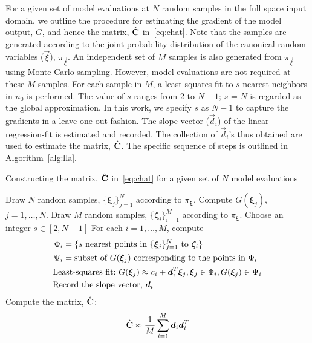 For a given set of model evaluations at $N$ random samples in the full space input domain,
we outline the procedure for estimating the gradient of the model output, $G$, and hence the
matrix, $\hat{\mathbf{{C}}}$ in~\eqref{eq:chat}.
Note that the samples are generated
according to the joint probability distribution of the canonical random variables
($\vec\xi$), $\pi_\vec\xi$. An independent set of $M$ samples is also generated from $\pi_\vec\xi$
using Monte Carlo sampling. However, model evaluations are not required at these $M$ samples.
For each sample in $M$, a least-squares fit to $s$ nearest neighbors in
$n_0$ is performed. The value of $s$ ranges from 2 to $N-1$; $s$ = $N$ is regarded as the global approximation.
In this work, we specify $s$ as $N-1$ to capture the gradients in a leave-one-out fashion.
The slope vector ($\vec{d}_i$) of the linear regression-fit is estimated and recorded.
The collection of $\vec{d}_i$'s thus obtained are used to estimate the matrix, $\hat{\mathbf{{C}}}$. The specific 
sequence of steps is outlined in Algorithm~\ref{alg:lla}.
%
\bigskip
\begin{breakablealgorithm}
\renewcommand{\algorithmicrequire}{\textbf{Input:}}
\renewcommand{\algorithmicensure}{\textbf{Output:}}
  \caption{Constructing the matrix, $\hat{\mathbf{{C}}}$ in~\eqref{eq:chat} for a given set of $N$ model evaluations}
  \begin{algorithmic}[1]
	\State Draw $N$ random samples, $\{\bm{\xi}_j\}_{j=1}^{N}$ 
	according to $\pi_{\bm{\xi}}$.
	\State Compute $G(\bm\xi_j)$, $j=1, \ldots, N$.
	\State Draw $M$ random samples, $\{\bm{\zeta}_i\}_{i=1}^{M}$
	according to $\pi_{\bm{\xi}}$.
	\State Choose an integer $s \in [2,N-1]$ 
	\State For each $i=1, \ldots, M$, compute 
	\[
	\begin{aligned}
	\Phi_i &= \{ s \text{ nearest points in } \{\bm{\xi}_j\}_{j=1}^{N} \text{ to } \bm{\zeta}_i\}\\
	\vspace{-2mm}
	\Psi_i &= \text{subset of } G(\bm\xi_j) \text{ corresponding to the points in } \Phi_i\\
	\vspace{-2mm}
	 &{\color{white}=} \hspace{-7mm} \text{Least-squares fit:~} 
	 G(\bm\xi_j) \approx c_i + \vec{d}_i^T\bm{\xi}_j,  \bm{\xi}_j \in \Phi_i, G(\bm\xi_j) \in \Psi_i\\
	 \vspace{-2mm}
	  &{\color{white}=} \hspace{-7mm}\text{Record the slope vector,}~\vec{d}_i
	\end{aligned}
	\]
	\State Compute the matrix, $\hat{\mathbf{{C}}}$:
	\[
	\hat{\mat{C}} \approx \frac{1}{M} \sum_{i=1}^{M} \vec{d}_i\vec{d}_i^T 
	\]
	\EndProcedure
  \end{algorithmic}
  \label{alg:lla}
\end{breakablealgorithm}
\bigskip
%

